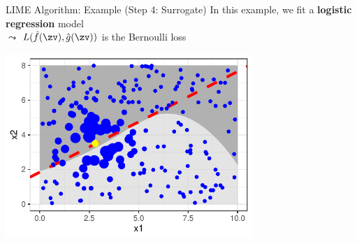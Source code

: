 \documentclass[10pt,compress,t,notes=noshow, xcolor=table]{beamer}
\newcommand{\gh}{\hat{g}}
\begin{document}
\begin{frame}{LIME Algorithm: Example (Step 4: Surrogate)}
		In this example, we fit a \textbf{logistic regression} model\\
        $\leadsto$ $L(\fh(\zv), \gh(\zv))$ is the Bernoulli loss
		\begin{center}
			\includegraphics[width=0.7\textwidth]{figure/lime5}
		\end{center}
\end{frame}

\endlecture
\end{document}
